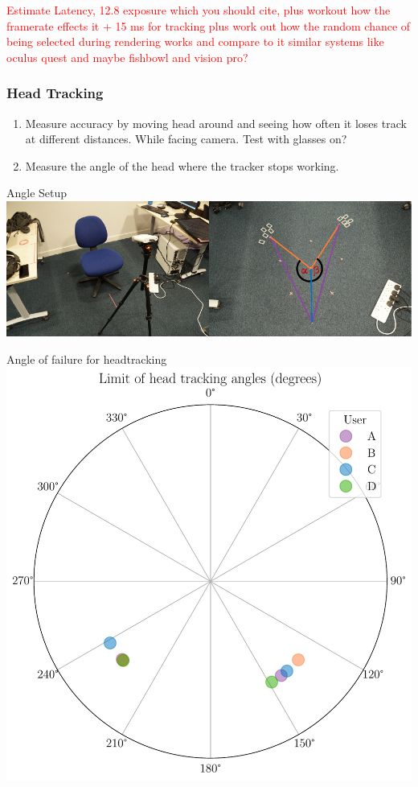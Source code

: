 \textcolor{red}{Estimate Latency, 12.8 exposure which you should cite, plus workout how the framerate effects it + 15 ms for tracking plus work out how the random chance of being selected during rendering works and compare to it similar systems like oculus quest and maybe fishbowl and vision pro?} 

\subsubsection{Head Tracking}
\begin{enumerate}
	\item Measure accuracy by moving head around and seeing how often it loses track at different distances. While facing camera. Test with glasses on?
	\item Measure the angle of the head where the tracker stops working.  
\end{enumerate}


\begin{figureBox}[label={fig:angle-setup}, width=1.0\linewidth]{Angle Setup}
	\includegraphics[width = 1.0\linewidth]{./evaluation/figures/angle-setup.pdf}
\end{figureBox}


\begin{figureBox}[label={fig:head-angle}, width=0.7\linewidth]{Angle of failure for headtracking}
	\includegraphics[width = 1.0\linewidth]{./evaluation/figures/user-angles.pdf}
\end{figureBox}

